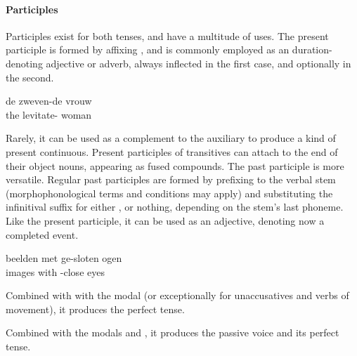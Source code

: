 \paragraph{Participles}
Participles exist for both tenses, and have a multitude of uses.
The present participle is formed by affixing , and is commonly employed as an duration-denoting adjective or adverb, always inflected in the first case, and optionally in the second.
\begin{exe}
\ex
\gll de zweven-de vrouw\\
the levitate- woman\\
\end{exe}
Rarely, it can be used as a complement to the auxiliary  to produce a kind of present continuous.
Present participles of transitives can attach to the end of their object nouns, appearing as fused compounds.
The past participle is more versatile.
Regular past participles are formed by prefixing  to the verbal stem (morphophonological terms and conditions may apply) and substituting the infinitival suffix for either ,  or nothing, depending on the stem's last phoneme.
Like the present participle, it can be used as an adjective, denoting now a completed event.
\begin{exe}
\ex
\gll beelden met ge-sloten ogen\\
images with -close eyes\\
\end{exe}
Combined with with the modal  (or exceptionally  for unaccusatives and verbs of movement), it produces the perfect tense.
\begin{exe}
\ex
\end{exe}
Combined with the modals  and , it produces the passive voice and its perfect tense.

